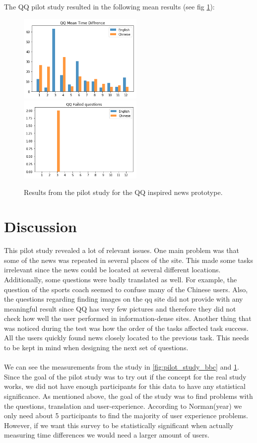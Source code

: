 \newpage
The QQ pilot study resulted in the following mean results (see fig \ref{fig:pilot_study_qq}):
\begin{figure}[h]
	\centering
	\includegraphics[width=60mm]{Images/pilot_study_qq_mean_time}
	\includegraphics[width=60mm]{Images/pilot_study_qq_failed}
	\decoRule
	\caption[QQ pilot study results]{Results from the pilot study for the QQ inspired news prototype.}
	\label{fig:pilot_study_qq}
\end{figure}

\section{Discussion}
This pilot study revealed a lot of relevant issues. One main problem was that some of the news was repeated in several places of the site. This made some tasks irrelevant since the news could be located at several different locations. Additionally, some questions were badly translated as well. For example, the question of the sports coach seemed to confuse many of the Chinese users. Also, the questions regarding finding images on the qq site did not provide with any meaningful result since QQ has very few pictures and therefore they did not check how well the user performed in information-dense sites. Another thing that was noticed during the test was how the order of the tasks affected task success. All the users quickly found news closely located to the previous task. This needs to be kept in mind when designing the next set of questions.
\\\\
We can see the measurements from the study in \ref{fig:pilot_study_bbc} and \ref{fig:pilot_study_qq}. Since the goal of the pilot study was to try out if the concept for the real study works, we did not have enough participants for this data to have any statistical significance. As mentioned above, the goal of the study was to find problems with the questions, translation and user-experience. According to Norman(year) we only need about 5 participants to find the majority of user experience problems. However, if we want this survey to be statistically significant when actually measuring time differences we would need a larger amount of users.


